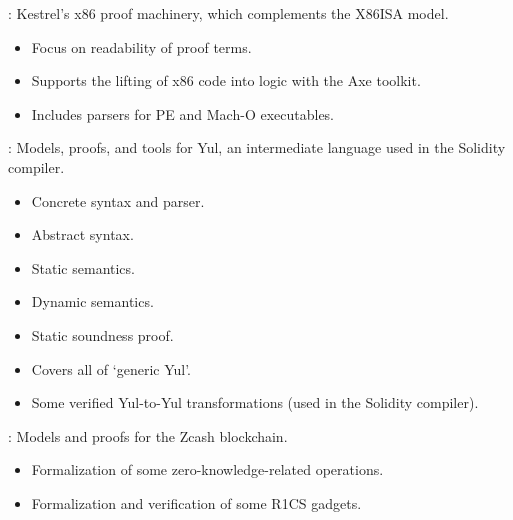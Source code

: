 
\begin{frame}

\newlibtitle

:
Kestrel's x86 proof machinery, which complements the X86ISA model.
\begin{itemize}
\item Focus on readability of proof terms.
\item Supports the lifting of x86 code into logic with the Axe toolkit.
\item Includes parsers for PE and Mach-O executables.
\end{itemize}

\end{frame}


\begin{frame}

\newlibtitle

:
Models, proofs, and tools for Yul,
an intermediate language used in the Solidity compiler.
\begin{itemize}
\item Concrete syntax and parser.
\item Abstract syntax.
\item Static semantics.
\item Dynamic semantics.
\item Static soundness proof.
\item Covers all of `generic Yul'.
\item Some verified Yul-to-Yul transformations (used in the Solidity compiler).
\end{itemize}

\end{frame}


\begin{frame}

\newlibtitle

:
Models and proofs for the Zcash blockchain.
\begin{itemize}
\item Formalization of some zero-knowledge-related operations.
\item Formalization and verification of some R1CS gadgets.
\end{itemize}
\end{frame}


